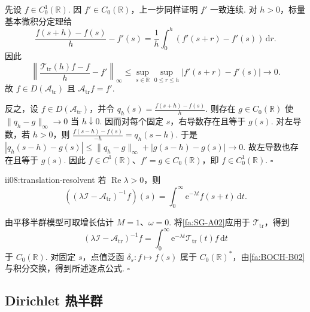 \begin{FAProof}
先设 \(\displaystyle f\in C_0^1(\mathbb R)\). 因 \(\displaystyle f'\in C_0(\mathbb R)\)，上一步同样证明 \(\displaystyle f'\) 一致连续. 对 \(\displaystyle h>0\)，标量基本微积分定理给
\[
\frac{f(s+h)-f(s)}h-f'(s)
=
\frac{1}{h}\int_0^h(f'(s+r)-f'(s))\,\mathrm{d}r.
\]
因此
\[
\left\|
\frac{\mathcal T_{\mathrm{tr}}(h)f-f}{h}-f'
\right\|_\infty
\leqslant
\sup_{s\in\mathbb R}\sup_{0\leqslant r\leqslant h}|f'(s+r)-f'(s)|
\longrightarrow0.
\]
故 \(\displaystyle f\in D(\mathcal A_{\mathrm{tr}})\) 且 \(\displaystyle\mathcal A_{\mathrm{tr}}f=f'\).

反之，设 \(\displaystyle f\in D(\mathcal A_{\mathrm{tr}})\)，并令
\(\displaystyle q_h(s)=\frac{f(s+h)-f(s)}h.\)
则存在 \(\displaystyle g\in C_0(\mathbb R)\) 使 \(\displaystyle\|q_h-g\|_\infty\to0\) 当 \(\displaystyle h\downarrow0\). 因而对每个固定 \(\displaystyle s\)，右导数存在且等于 \(\displaystyle g(s)\). 对左导数，若 \(\displaystyle h>0\)，则
\(\displaystyle \frac{f(s-h)-f(s)}{-h} = q_h(s-h).\)
于是
\(\displaystyle |q_h(s-h)-g(s)| \leqslant \|q_h-g\|_\infty+|g(s-h)-g(s)| \longrightarrow0.\)
故左导数也存在且等于 \(\displaystyle g(s)\). 因此 \(\displaystyle f\in C^1(\mathbb R)\)、\(\displaystyle f'=g\in C_0(\mathbb R)\)，即 \(\displaystyle f\in C_0^1(\mathbb R)\).
\hfill\(\square\)
\end{FAProof}

\begin{FAProposition}{ii08:translation-resolvent}
若 \(\displaystyle\operatorname{Re}\lambda>0\)，则
\[
\left(
(\lambda\mathcal I-\mathcal A_{\mathrm{tr}})^{-1}f
\right)(s)
=
\int_0^\infty\mathrm{e}^{-\lambda t}f(s+t)\,\mathrm{d}t.
\]
\end{FAProposition}

\begin{FAProof}
由平移半群模型可取增长估计 \(\displaystyle M=1\)、\(\displaystyle\omega=0\). 将\autoref{fa:SG-A02}应用于 \(\displaystyle\mathcal T_{\mathrm{tr}}\)，得到
\[
(\lambda\mathcal I-\mathcal A_{\mathrm{tr}})^{-1}f
=
\int_0^\infty\mathrm{e}^{-\lambda t}\mathcal T_{\mathrm{tr}}(t)f\,\mathrm{d}t
\]
于 \(\displaystyle C_0(\mathbb R)\). 对固定 \(\displaystyle s\)，点值泛函 \(\displaystyle\delta_s:f\mapsto f(s)\) 属于 \(\displaystyle C_0(\mathbb R)^*\)，由\autoref{fa:BOCH-B02}与积分交换，得到所述逐点公式.
\hfill\(\square\)
\end{FAProof}

\subsection{Dirichlet 热半群}

